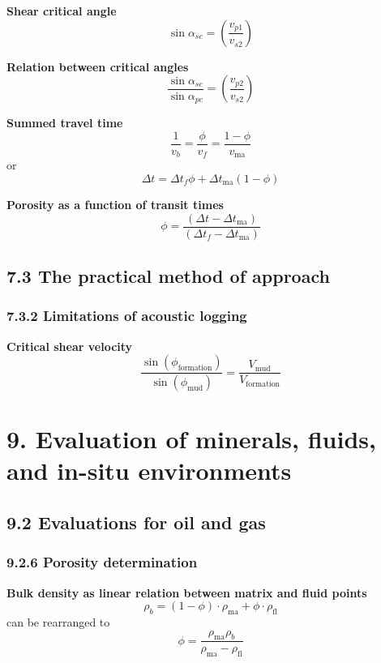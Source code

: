 \textbf{Shear critical angle}
\begin{equation*}
    \sin\alpha_{sc} = \left( \frac{v_{p1}}{v_{s2}} \right)\tag{7.29}
\end{equation*}

\textbf{Relation between critical angles}
\begin{equation*}
    \frac{\sin\alpha_{sc}}{\sin\alpha_{pc}} = \left( \frac{v_{p2}}{v_{s2}} \right)\tag{7.30}
\end{equation*}

\textbf{Summed travel time}
\begin{equation*}
    \frac{1}{v_b} = \frac{\phi}{v_f} = \frac{1-\phi}{v_\mathrm{ma}}\tag{7.31}
\end{equation*}
or
\begin{equation*}
    \Delta t = \Delta t_f \phi + \Delta t_\mathrm{ma}(1-\phi)\tag{7.32}
\end{equation*}

\textbf{Porosity as a function of transit times}
\begin{equation*}
    \phi = \frac{(\Delta t - \Delta t_\mathrm{ma})}{(\Delta t_f - \Delta t_\mathrm{ma})}\tag{7.33}
\end{equation*}

\subsection{7.3 The practical method of approach}
\subsubsection{7.3.2 Limitations of acoustic logging}
\textbf{Critical shear velocity}
\begin{equation*}
    \frac{\sin(\phi_\mathrm{formation})}{\sin(\phi_\mathrm{mud})} = \frac{V_\mathrm{mud}}{V_\mathrm{formation}}\tag{7.34}
\end{equation*}

\section{9. Evaluation of minerals, fluids, and in-situ environments}
\subsection{9.2 Evaluations for oil and gas}
\subsubsection{9.2.6 Porosity determination}
\textbf{Bulk density as linear relation between matrix and fluid points}
\begin{equation*}
    \rho_b = (1-\phi)\cdot\rho_\mathrm{ma} + \phi\cdot\rho_\mathrm{fl}\tag{9A.1}
\end{equation*}
can be rearranged to
\begin{equation*}
    \phi = \frac{\rho_\mathrm{ma} \rho_b}{\rho_\mathrm{ma} - \rho_\mathrm{fl}}\tag{9A.2}
\end{equation*}

